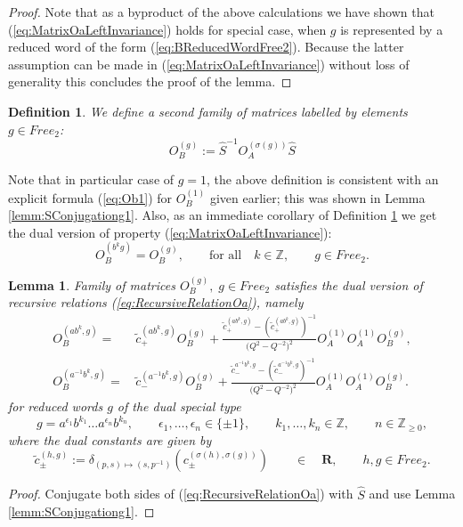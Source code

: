 \documentclass{amsart}
\newtheorem{definition}[theorem]{Definition}
\newtheorem{lemma}[theorem]{Lemma}
\begin{document}
\begin{proof}
Note that as a byproduct of the above calculations we have shown that (\ref{eq:MatrixOaLeftInvariance}) holds for special case, when $g$ is represented by a reduced word of the form (\ref{eq:BReducedWordFree2}). Because the latter assumption can be made in (\ref{eq:MatrixOaLeftInvariance}) without loss of generality this concludes the proof of the lemma.
\end{proof}

\begin{definition}
    We define a second family of matrices labelled by elements $g\in Free_2$:
    \begin{equation}
    O_B^{(g)}:=\widehat S^{-1}O_A^{(\sigma(g))}\widehat S
    \label{eq:MatrixOBgDef}
    \end{equation}
\label{def:Obg}
\end{definition}
Note that in particular case of $g=1$, the above definition is consistent with an explicit formula (\ref{eq:Ob1}) for $O_B^{(1)}$ given earlier; this was shown in Lemma \ref{lemm:SConjugationg1}. Also, as an immediate corollary of Definition \ref{def:Obg} we get the dual version of property (\ref{eq:MatrixOaLeftInvariance}):
\begin{equation}
O_B^{(b^kg)}=O_B^{(g)},\qquad\textrm{for all}\quad k\in\mathbb Z,\qquad g\in Free_2.
\label{eq:MatrixObLeftInvariance}
\end{equation}

\begin{lemma}
Family of matrices $O_B^{(g)},\;g\in Free_2$ satisfies the dual version of recursive relations (\ref{eq:RecursiveRelationOa}), namely
\begin{subequations}
\begin{align}
O_B^{(ab^k,g)}=&\,\widetilde c_+^{(ab^k,g)}O_B^{(g)}+\frac{\widetilde c_+^{(ab^k,g)}-\left(\widetilde c_+^{(ab^k,g)}\right)^{-1}}{\big(Q^2-Q^{-2}\big)^2}O_A^{(1)}O_A^{(1)}O_B^{(g)},\\
O_B^{(a^{-1}b^k,g)}=&\,\widetilde c_-^{(a^{-1}b^k,g)}O_B^{(g)}+\frac{\widetilde c_-^{a^{-1}b^k,g}-\left(\widetilde c_-^{a^{-1}b^k,g}\right)^{-1}}{\big(Q^2-Q^{-2}\big)^2}O_A^{(1)}O_A^{(1)}O_B^{(g)}.
\end{align}
\label{eq:RecursiveRelationOb}
\end{subequations}
for reduced words $g$ of the dual special type
\begin{equation}
g=a^{\epsilon_1}b^{k_1}\dots a^{\epsilon_n}b^{k_n},\qquad \epsilon_1,\dots,\epsilon_n\in\{\pm1\},\qquad k_1,\dots,k_n\in\mathbb Z,\qquad n\in\mathbb Z_{\geq0},
\label{eq:AReducedWordFree2}
\end{equation}
where the dual constants are given by
\begin{equation}
\widetilde c_{\pm}^{(h,g)}:=\delta_{(p,s)\mapsto(s,p^{-1})}\left(c_{\pm}^{(\sigma(h),\sigma(g))}\right)\qquad\in\quad\mathbf R,\qquad h,g\in Free_2.
\label{eq:ctildeDef}
\end{equation}
\end{lemma}
\begin{proof}
Conjugate both sides of (\ref{eq:RecursiveRelationOa}) with $\widehat S$ and use Lemma \ref{lemm:SConjugationg1}.
\end{proof}
\end{document}
